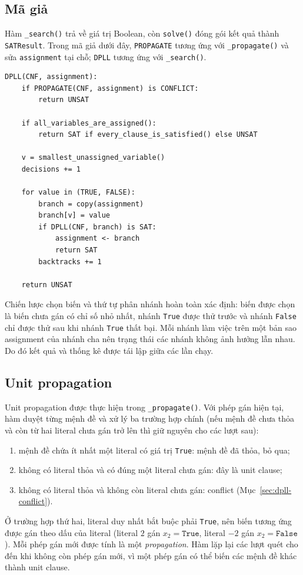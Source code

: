\subsection{Mã giả}
Hàm \texttt{\_search()} trả về giá trị Boolean, còn \texttt{solve()} đóng
gói kết quả thành \texttt{SATResult}. Trong mã giả dưới đây,
\texttt{PROPAGATE} tương ứng với \texttt{\_propagate()} và sửa
\texttt{assignment} tại chỗ; \texttt{DPLL} tương ứng với \texttt{\_search()}.

\begin{lstlisting}[caption={Mã giả DPLL sử dụng trong chương trình}]
DPLL(CNF, assignment):
    if PROPAGATE(CNF, assignment) is CONFLICT:
        return UNSAT

    if all_variables_are_assigned():
        return SAT if every_clause_is_satisfied() else UNSAT

    v = smallest_unassigned_variable()
    decisions += 1

    for value in (TRUE, FALSE):
        branch = copy(assignment)
        branch[v] = value
        if DPLL(CNF, branch) is SAT:
            assignment <- branch
            return SAT
        backtracks += 1

    return UNSAT
\end{lstlisting}

Chiến lược chọn biến và thứ tự phân nhánh hoàn toàn xác định: biến được chọn
là biến chưa gán có chỉ số nhỏ nhất, nhánh \texttt{True} được thử trước và
nhánh \texttt{False} chỉ được thử sau khi nhánh \texttt{True} thất bại. Mỗi
nhánh làm việc trên một bản sao assignment của nhánh cha nên trạng thái các
nhánh không ảnh hưởng lẫn nhau. Do đó kết quả và thống kê được tái lập giữa
các lần chạy.

\subsection{Unit propagation}
Unit propagation được thực hiện trong \texttt{\_propagate()}. Với phép gán
hiện tại, hàm duyệt từng mệnh đề và xử lý ba trường hợp chính (nếu mệnh đề
chưa thỏa và còn từ hai literal chưa gán trở lên thì giữ nguyên cho các lượt
sau):
\begin{enumerate}
    \item mệnh đề chứa ít nhất một literal có giá trị \texttt{True}: mệnh đề
    đã thỏa, bỏ qua;
    \item không có literal thỏa và có đúng một literal chưa gán: đây là unit
    clause;
    \item không có literal thỏa và không còn literal chưa gán: conflict
    (Mục~\ref{sec:dpll-conflict}).
\end{enumerate}
Ở trường hợp thứ hai, literal duy nhất bắt buộc phải \texttt{True}, nên biến
tương ứng được gán theo dấu của literal (literal $2$ gán $x_2=\texttt{True}$,
literal $-2$ gán $x_2=\texttt{False}$). Mỗi phép gán mới được tính là một
\emph{propagation}. Hàm lặp lại các lượt quét cho đến khi không còn phép gán
mới, vì một phép gán có thể biến các mệnh đề khác thành unit clause.


